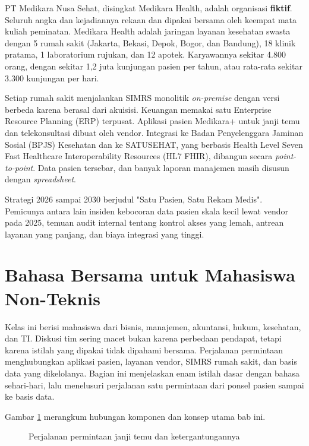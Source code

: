 \begin{kasus}[title={Kasus Medikara Health: Profil Singkat}]
  PT Medikara Nusa Sehat, disingkat Medikara Health, adalah organisasi
  \textbf{fiktif}. Seluruh angka dan kejadiannya rekaan dan dipakai bersama oleh keempat
  mata kuliah peminatan. Medikara Health adalah jaringan layanan kesehatan swasta dengan
  5 rumah sakit (Jakarta, Bekasi, Depok, Bogor, dan Bandung), 18 klinik pratama, 1
  laboratorium rujukan, dan 12 apotek. Karyawannya sekitar 4.800 orang, dengan sekitar
  1,2 juta kunjungan pasien per tahun, atau rata-rata sekitar 3.300 kunjungan per hari.

  Setiap rumah sakit menjalankan SIMRS monolitik \textit{on-premise} dengan versi
  berbeda karena berasal dari akuisisi. Keuangan memakai satu Enterprise Resource
  Planning (ERP) terpusat. Aplikasi pasien Medikara+ untuk janji temu dan
  telekonsultasi dibuat oleh vendor. Integrasi ke Badan Penyelenggara Jaminan Sosial
  (BPJS) Kesehatan dan ke SATUSEHAT, yang berbasis Health Level Seven Fast Healthcare
  Interoperability Resources (HL7 FHIR), dibangun secara \textit{point-to-point}. Data
  pasien tersebar, dan banyak laporan manajemen masih disusun dengan
  \textit{spreadsheet}.

  Strategi 2026 sampai 2030 berjudul "Satu Pasien, Satu Rekam Medis". Pemicunya antara
  lain insiden kebocoran data pasien skala kecil lewat vendor pada 2025, temuan audit
  internal tentang kontrol akses yang lemah, antrean layanan yang panjang, dan biaya
  integrasi yang tinggi.
\end{kasus}

\section{Bahasa Bersama untuk Mahasiswa Non-Teknis}

Kelas ini berisi mahasiswa dari bisnis, manajemen, akuntansi, hukum, kesehatan, dan TI.
Diskusi tim sering macet bukan karena perbedaan pendapat, tetapi karena istilah yang
dipakai tidak dipahami bersama. Perjalanan permintaan menghubungkan aplikasi pasien, layanan vendor,
SIMRS rumah sakit, dan basis data yang dikelolanya. Bagian ini menjelaskan enam istilah dasar dengan bahasa sehari-hari, lalu
menelusuri perjalanan satu permintaan dari ponsel pasien sampai ke basis data.

Gambar \ref{fig:ch01-bahasa-bersama} merangkum hubungan komponen dan konsep utama bab ini.
\begin{figure}[!htb]
  \centering
  
  \caption{Perjalanan permintaan janji temu dan ketergantungannya}
  \label{fig:ch01-bahasa-bersama}
\end{figure}

